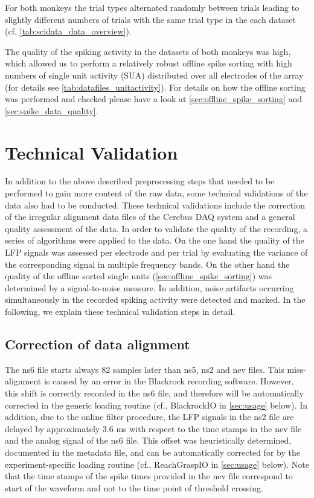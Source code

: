 For both monkeys the trial types alternated randomly between trials leading to slightly different numbers of trials with the same trial type in the each dataset (cf. \cref{tab:scidata_data_overview}). 

The quality of the spiking activity in the datasets of both monkeys was high, which allowed us to perform a relatively robust offline spike sorting with high numbers of single unit activity (SUA) distributed over all electrodes of the array (for details see \cref{tab:datafiles_unitactivity}). For details on how the offline sorting was performed and checked please have a look at \cref{sec:offline_spike_sorting} and \cref{sec:spike_data_quality}. 


\section{Technical Validation}
\label{sec:technical_validation}

In addition to the above described preprocessing steps that needed to be performed to gain more content of the raw data, some technical validations of the data also had to be conducted. These technical validations include the correction of the irregular alignment data files of the Cerebus DAQ system and a general quality assessment of the data. In order to validate the quality of the recording, a series of algorithms were applied to the data. On the one hand the quality of the LFP signals was assessed per electrode and per trial by evaluating the variance of the corresponding signal in multiple frequency bands. On the other hand the quality of the offline sorted single units (\cref{sec:offline_spike_sorting}) was determined by a signal-to-noise measure. In addition, noise artifacts occurring simultaneously in the recorded spiking activity were detected and marked. In the following, we explain these technical validation steps in detail.

\subsection{Correction of data alignment}

The ns6 file starts always 82 samples later than ns5, ns2 and nev files. This miss-alignment is caused by an error in the Blackrock recording software. However, this shift is correctly recorded in the ns6 file, and therefore will be automatically corrected in the generic  loading routine (cf., BlackrockIO in \cref{sec:usage} below). In addition, due to the online filter procedure, the LFP signals in the ns2 file are delayed by approximately 3.6 ms with respect to the time stamps in the nev file and the analog signal of the ns6 file. This offset was heuristically determined, documented in the metadata file, and can be automatically corrected for by the experiment-specific loading routine (cf., ReachGraspIO in \cref{sec:usage} below). Note that the time stamps of the spike times provided in the nev file correspond to start of the waveform and not to the time point of threshold crossing.

